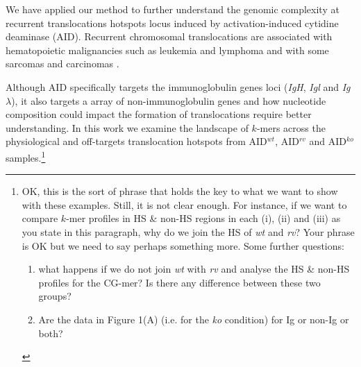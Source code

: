 \documentclass{bioinfo}
\begin{document}
We have applied our method to further understand the genomic complexity at recurrent translocations hotspots locus induced by activation-induced cytidine deaminase (AID). Recurrent chromosomal translocations are associated with hematopoietic malignancies such as leukemia and lymphoma and with some sarcomas and carcinomas \cite{pmid20371343}.

Although AID specifically targets the immunoglobulin genes loci (\emph{IgH}, \emph{Igl} and \emph{Ig}$\lambda$), it also targets a array of non-immunoglobulin genes and how nucleotide composition could impact the formation of translocations require better understanding. In this work we examine the landscape of $k$-mers across the physiological and off-targets translocation hotspots from AID$^{wt}$, AID$^{rv}$ and AID$^{ko}$ samples.\footnote{OK, this is the sort of phrase that holds the key to what we want to show with these examples. Still, it is not clear enough. For instance, if we want to compare $k$-mer profiles in HS & non-HS regions in each (i), (ii) and (iii) as you state in this paragraph, why do we join the HS of \emph{wt} and \emph{rv}? Your phrase is OK but we need to say perhaps something more. Some further questions: 
\begin{enumerate}
\item what happens if we do not join \emph{wt} with \emph{rv} and analyse the HS \& non-HS profiles for the CG-mer? Is there any difference between these two groups?
\item Are the data in Figure 1(A) (i.e. for the \emph{ko} condition) for Ig or non-Ig or both?
\end{enumerate}}
\end{document}

